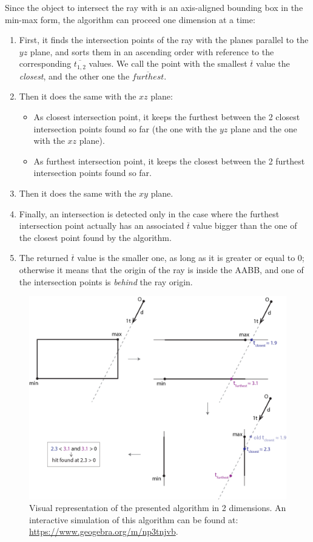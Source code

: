 \documentclass{PoliMi_MasterThesis}
\begin{document}
Since the object to intersect the ray with is an axis-aligned bounding box in the min-max form, the algorithm can proceed one dimension at a time:
\begin{enumerate}
	\item First, it finds the intersection points of the ray with the planes parallel to the $yz$ plane, and sorts them in an ascending order with reference to the corresponding $\overline{t_{1,2}}$ values. We call the point with the smallest $\overline{t}$ value the \textit{closest}, and the other one the $\overline{furthest}$.
	\item Then it does the same with the $xz$ plane:
	\begin{itemize}
		\item As closest intersection point, it keeps the furthest between the 2 closest intersection points found so far (the one with the $yz$ plane and the one with the $xz$ plane).
		\item As furthest intersection point, it keeps the closest between the 2 furthest intersection points found so far.
	\end{itemize}
	\item Then it does the same with the $xy$ plane.
	\item Finally, an intersection is detected only in the case where the furthest intersection point actually has an associated $\overline{t}$ value bigger than the one of the closest point found by the algorithm.
	\item The returned $\overline{t}$ value is the smaller one, as long as it is greater or equal to 0; otherwise it means that the origin of the ray is inside the AABB, and one of the intersection points is \textit{behind} the ray origin.
\end{enumerate}
	
\begin{figure}[H]
    \centering
    \includegraphics[width=\textwidth]{Images/ray_aabb_intersection.png}
    \caption{Visual representation of the presented algorithm in 2 dimensions. An interactive simulation of this algorithm can be found at: \url{https://www.geogebra.org/m/np3tnjvb}.}
    \label{fig:ray_aabb_intersection}
\end{figure}
\end{document}
